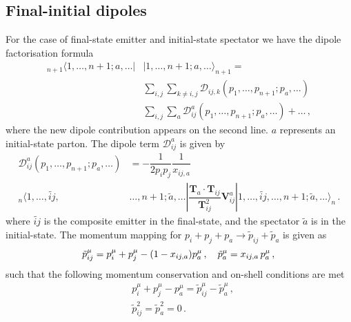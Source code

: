 \documentclass[main.tex]{subfiles}
\begin{document}
    \subsection{Final-initial dipoles}
        For the case of final-state emitter and initial-state
        spectator we have the dipole factorisation formula
        \begin{equation}\label{eqn:FI_factorisation}
            \begin{split}
                {}_{n+1}\langle 1, \ldots, n+1; a, \ldots |&| 1, \ldots, n+1; a, \ldots \rangle_{n+1} = \\
                &\sum_{i,j}\sum_{k\neq i,j} \mathcal{D}_{ij,k}(p_{1},\ldots,p_{n+1};p_{a},\ldots) \\
                &\sum_{i,j}\sum_{a} \mathcal{D}_{ij}^{a}(p_{1},\ldots,p_{n+1};p_{a},\ldots) + \ldots \, ,
            \end{split}
        \end{equation}
        where the new dipole contribution appears on the second line. $a$ represents an initial-state parton.
        The dipole term $\mathcal{D}_{ij}^{a}$ is given by
        \begin{equation}\label{eqn:D_aij}
            \begin{split}
                \mathcal{D}_{ij}^{a}(p_{1}, \ldots, p_{n+1}; p_{a}, \ldots) &= -\dfrac{1}{2p_{i}p_{j}} \dfrac{1}{x_{ij,a}} \\
                {}_{n} \langle 1, \ldots, \widetilde{ij}, &\ldots, n+1; \tilde{a}, \ldots | \dfrac{\boldsymbol{T}_{a} \cdot \boldsymbol{T}_{ij}}{\boldsymbol{T}_{ij}^{2}} \boldsymbol{V}_{ij}^{a} | 1, \ldots, \widetilde{ij}, \ldots, n+1; \tilde{a} , \ldots \rangle_{n} \, .
            \end{split}
        \end{equation}
        where $\widetilde{ij}$ is the composite emitter in the
        final-state, and the spectator $\tilde{a}$ is in the initial-state.
        The momentum mapping for $p_{i} + p_{j} + p_{a} \rightarrow \tilde{p}_{ij} + \tilde{p}_{a}$ is given as
        \begin{equation}\label{eqn:FI_mapping}
            \tilde{p}_{ij}^{\mu} = p_{i}^{\mu} + p_{j}^{\mu} - (1-x_{ij,a})p_{a}^{\mu} \, , \quad \tilde{p}_{a}^{\mu} = x_{ij,a} \, p_{a}^{\mu} \, , \\
        \end{equation}
        such that the following momentum conservation and on-shell conditions are met
        \begin{equation}\label{eqn:FI_mapping_conditions}
            \begin{split}
                &p_{i}^{\mu} + p_{j}^{\mu} - p_{a}^{\mu} = \tilde{p}_{ij}^{\mu} - \tilde{p}_{a}^{\mu} \, , \\
                &\tilde{p}_{ij}^{2} = \tilde{p}_{a}^{2} = 0 \, .
            \end{split}
        \end{equation}
\end{document}
